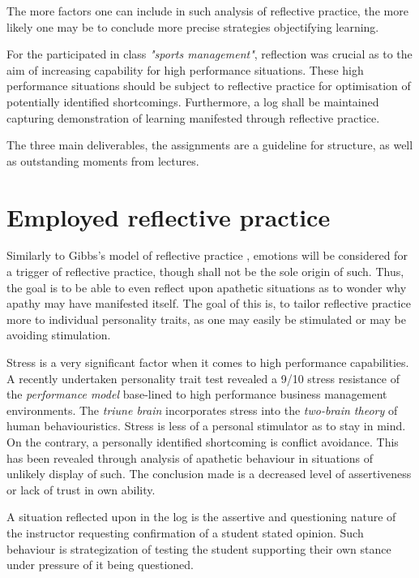 \documentclass[12pt]{article}
\begin{document}
The more factors one can include in such analysis of reflective practice, the
more likely one may be to conclude more precise strategies objectifying learning.

For the participated in class \textit{"sports management"}, reflection was
crucial as to the aim of increasing capability for high performance situations.
These high performance situations should be subject to reflective practice for
optimisation of potentially identified shortcomings. Furthermore, a log shall be
maintained capturing demonstration of learning manifested through reflective
practice.

The three main deliverables, the assignments are a guideline for structure, as
well as outstanding moments from lectures. 

\section{Employed reflective practice}
Similarly to Gibbs's model of reflective practice \cite{gibbs:reflectiveModel},
emotions will be considered for a trigger of reflective practice, though shall
not be the sole origin of such. Thus, the goal is to be able to even reflect
upon apathetic situations as to wonder why apathy may have manifested itself.
The goal of this is, to tailor reflective practice more to individual
personality traits, as one may easily be stimulated or may be avoiding
stimulation.

Stress is a very significant factor when it comes to high performance
capabilities. A recently undertaken personality trait test revealed a 9/10
stress resistance of the \textit{performance model} base-lined to high
performance business management environments. The \textit{triune brain}
incorporates stress into the \textit{two-brain theory} of human behaviouristics.
Stress is less of a personal stimulator as to stay in mind. On the contrary, a
personally identified shortcoming is conflict avoidance. This has been revealed
through analysis of apathetic behaviour in situations of unlikely display of
such. The conclusion made is a decreased level of assertiveness or lack of trust
in own ability.

A situation reflected upon in the log is the assertive and questioning nature of
the instructor requesting confirmation of a student stated opinion. Such
behaviour is strategization of testing the student supporting their own stance
under pressure of it being questioned. 
\end{document}
